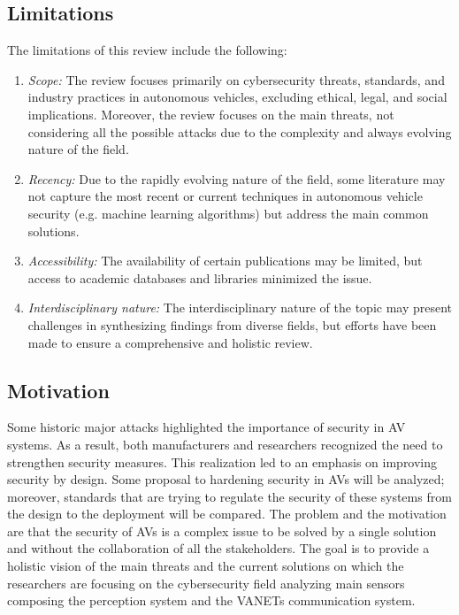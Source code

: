 \subsection{Limitations}\label{subsec:limitations}

The limitations of this review include the following:
\begin{enumerate}
    \item \textit{Scope:} The review focuses primarily on cybersecurity threats, standards, and industry practices in autonomous vehicles, excluding ethical, legal, and social implications.
    Moreover, the review focuses on the main threats, not considering all the possible attacks due to the complexity and always evolving nature of the field.
    \item \textit{Recency:} Due to the rapidly evolving nature of the field, some literature may not capture the most recent or current techniques in autonomous vehicle security (e.g. machine learning algorithms) but address the main common solutions.
    \item \textit{Accessibility:} The availability of certain publications may be limited, but access to academic databases and libraries minimized the issue.
    \item \textit{Interdisciplinary nature:} The interdisciplinary nature of the topic may present challenges in synthesizing findings from diverse fields, but efforts have been made to ensure a comprehensive and holistic review.
\end{enumerate}

\subsection{Motivation}\label{subsec:motivation}

Some historic major attacks highlighted the importance of security in AV systems.
As a result, both manufacturers and researchers recognized the need to strengthen security measures.
This realization led to an emphasis on improving security by design.
Some proposal to hardening security in AVs will be analyzed; moreover, standards that are trying to regulate the security of these systems from the design to the deployment will be compared.
The problem and the motivation are that the security of AVs is a complex issue to be solved by a single solution and without the collaboration of all the stakeholders\cite{comparison-standard}.
The goal is to provide a holistic vision of the main threats and the current solutions on which the researchers are focusing on the cybersecurity field
analyzing main sensors composing the perception system and the VANETs communication system.

